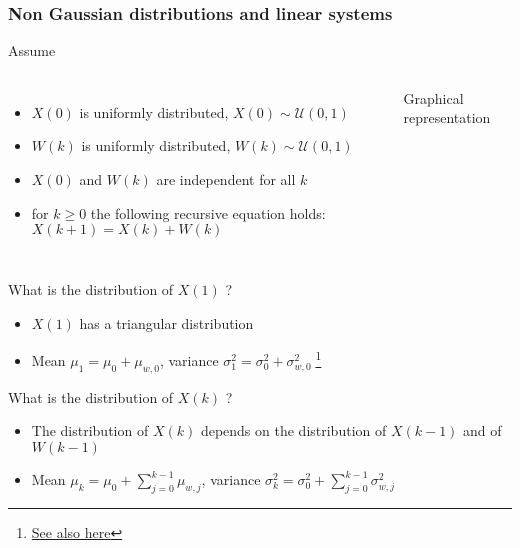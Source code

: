 \begin{frame}
	\frametitle{Non Gaussian distributions and linear systems}
	Assume 
	\begin{columns}
		\begin{itemize}
			\item $X(0)$ is uniformly distributed, $X(0)\sim\mathcal{U}(0, 1)$
			\item $W(k)$ is uniformly distributed, $W(k)\sim\mathcal{U}(0, 1)$
			\item $X(0)$ and $W(k)$ are independent for all $k$
			\item for $k\geq0$ the following recursive equation holds: $X(k+1) =X(k) + W(k)$
		\end{itemize}	
		\begin{block}{Graphical representation}
		\end{block}
	\end{columns}
	
	\vspace*{0.5em}
	
	 What is the distribution of $X(1)$ ?
	\begin{itemize}
		\item $X(1)$ has a triangular distribution
		\item Mean $\mu_1=\mu_0+\mu_{w,0}$, variance $\sigma_1^2 = \sigma_0^2 + \sigma_{w,0}^2\;$\footnote{\href{http://eli.thegreenplace.net/2009/01/07/variance-of-the-sum-of-independent-variables}{See also here}}
	\end{itemize}
	
	\vspace*{0.5em}
	 What is the distribution of $X(k)$ ?
	\begin{itemize}
		\item The distribution of $X(k)$ depends on the distribution of $X(k-1)$ and of $W(k-1)$
		\item Mean $\mu_k=\mu_0+\sum_{j=0}^{k-1}\mu_{w,j}$, variance $\sigma_k^2=\sigma_0^2 + \sum_{j=0}^{k-1}\sigma_{w,j}^2$
		
	\end{itemize}
\end{frame}

